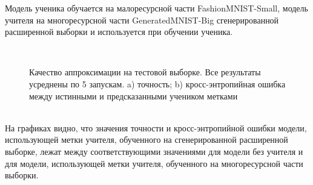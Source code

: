 Модель ученика обучается на малоресурсной части FashionMNIST-Small, модель учителя на многоресурсной части GeneratedMNIST-Big сгенерированной расширенной выборки и используется при обучении ученика.

\begin{figure}[h!t]\center
{}
\\
\caption{Качество аппроксимации на тестовой выборке. Все результаты усреднены по 5 запускам. a) точность; b) кросс-энтропийная ошибка между истинными и предсказанными учеником метками}
\end{figure}\\

На графиках видно, что значения точности и кросс-энтропийной ошибки модели, использующей метки учителя, обученного на сгенерированной расширенной выборке, лежат между соответствующими значениями для модели без учителя и для модели, использующей метки учителя, обученного на многоресурсной части выборки.